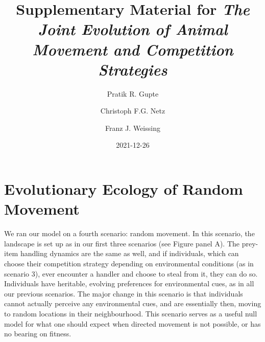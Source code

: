 \documentclass[]{article}
\title{Supplementary Material for \emph{The Joint Evolution of Animal Movement and Competition Strategies}}
\author{Pratik R. Gupte \and Christoph F.G. Netz \and Franz J. Weissing}
\date{2021-12-26}
\begin{document}
\maketitle

{
\setcounter{tocdepth}{2}
\tableofcontents
}
\newpage

\hypertarget{evolutionary-ecology-of-random-movement}{%
\section{Evolutionary Ecology of Random Movement}\label{evolutionary-ecology-of-random-movement}}

We ran our model on a fourth scenario: random movement.
In this scenario, the landscape is set up as in our first three scenarios (see Figure panel A).
The prey-item handling dynamics are the same as well, and if individuals, which can choose their competition strategy depending on environmental conditions (as in scenario 3), ever encounter a handler and choose to steal from it, they can do so.
Individuals have heritable, evolving preferences for environmental cues, as in all our previous scenarios.
The major change in this scenario is that individuals cannot actually perceive any environmental cues, and are essentially then, moving to random locations in their neighbourhood.
This scenario serves as a useful null model for what one should expect when directed movement is not possible, or has no bearing on fitness.
\end{document}
